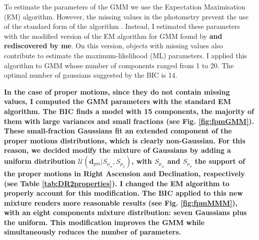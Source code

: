 To estimate the parameters of the GMM we use the Expectation Maximisation (EM) algorithm. However, the missing values in the photometry prevent the use of the standard form of the algorithm \cite[see for example Chapter 9 of][]{Bishop2006}.
Instead, I estimated these parameters with the modified version of the EM algorithm for GMM found by \citet{McMichael1996} \textbf{and rediscovered by me}. On this version, objects with missing values also contribute to estimate the maximum-likelihood (ML) parameters. I applied this algorithm to GMM whose number of components ranged from 1 to 20. The optimal number of gaussians suggested by the BIC is 14. 

\textbf{In the case of proper motions, since they do not contain missing values, I computed the GMM parameters with the standard EM algorithm. The BIC finds a model with 15 components, the majority of them with large variances and small fractions (see Fig. \ref{fig:fpmGMM}). These small-fraction Gaussians fit an extended component of the proper motions distributions, which is clearly non-Gaussian. For this reason, we decided modify the mixture of Gaussians by adding a uniform distribution $\mathcal{U}(\textbf{d}_{pm}|S_{\mu_{\alpha}},S_{\mu_{\delta}})$, with $S_{\mu_{\alpha}}$ and $S_{\mu_{\delta}}$ the support of the proper motions in Right Ascension and Declination, respectively (see Table \ref{tab:DR2properties}). I changed the EM algorithm to properly account for this modification. The BIC applied to this new mixture renders more reasonable results (see Fig. \ref{fig:fpmMMM}), with an eight components mixture distribution: seven Gaussians plus the uniform. This modification improves the GMM while simultaneously reduces the number of parameters.}

